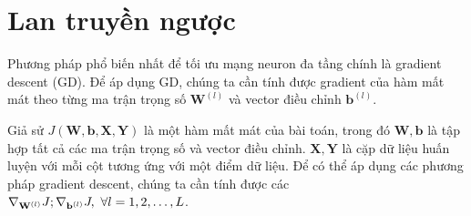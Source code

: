 



\section{Lan truyền ngược}

Phương pháp phổ biến nhất để tối ưu mạng neuron đa tầng chính là gradient
descent (GD). Để áp dụng GD, chúng ta cần tính được gradient của hàm mất mát
theo từng ma trận trọng số $\mathbf{W}^{(l)}$ và vector điều chỉnh $\mathbf{b}^{(l)}$.



Giả sử $J(\mathbf{W, b, X, Y})$ là một hàm mất mát của bài toán, trong đó
$\mathbf{W, b}$ là tập hợp tất cả các ma trận trọng số và vector điều chỉnh. $\mathbf{X, Y}$ là cặp dữ liệu huấn luyện với mỗi cột
tương ứng với một điểm dữ liệu. Để có thể áp dụng các phương pháp gradient descent,
chúng ta cần tính được các
\begin{math}
\nabla_{\mathbf{W}^{(l)}}J; \nabla_{\mathbf{b}^{(l)}}J, ~\forall l = 1, 2, \dots, L
\end{math}.

